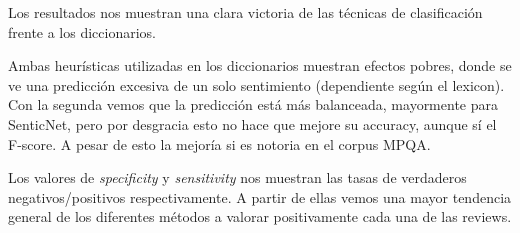 Los resultados nos muestran una clara victoria de las técnicas de clasificación frente a los diccionarios.

Ambas heurísticas utilizadas en los diccionarios muestran efectos pobres, donde se ve una predicción excesiva de un solo sentimiento (dependiente según el lexicon). Con la segunda vemos que la predicción está más balanceada, mayormente para SenticNet, pero por desgracia esto no hace que mejore su accuracy, aunque sí el F-score.
A pesar de esto la mejoría si es notoria en el corpus MPQA.

\vspace{\baselineskip}

Los valores de \textit{specificity} y \textit{sensitivity} nos muestran las tasas de verdaderos negativos/positivos respectivamente. A partir de ellas vemos una mayor tendencia general de los diferentes métodos a valorar positivamente cada una de las reviews.
